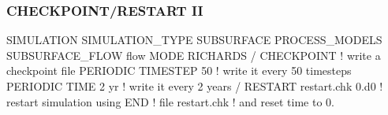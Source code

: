 \documentclass{beamer}
\newcommand\redcomment[1]{{{\color{red} #1}}}
\newcommand\bluecomment[1]{{{\color{blue} #1}}}
\begin{document}
\begin{frame}[fragile]\frametitle{CHECKPOINT/RESTART II}

\begin{semiverbatim}

SIMULATION
  SIMULATION_TYPE SUBSURFACE
  PROCESS_MODELS
    SUBSURFACE_FLOW flow
      MODE RICHARDS
    /
  CHECKPOINT               \bluecomment{! write a checkpoint file}
    PERIODIC TIMESTEP 50   \bluecomment{! write it every 50 timesteps}
    PERIODIC TIME 2 yr     \bluecomment{! write it every 2 years}
  /
  RESTART restart.chk \redcomment{0.d0}  \bluecomment{! restart simulation using}
END                         \bluecomment{! file \redcomment{restart.chk}}
                            \bluecomment{! and reset time to 0.}

\end{semiverbatim}

\end{frame}
\end{document}
